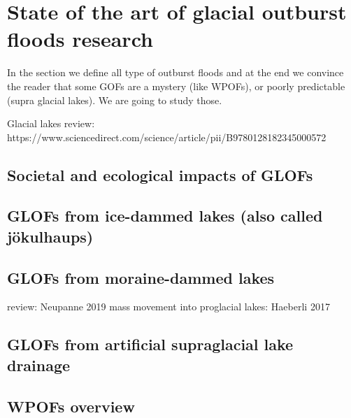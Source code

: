 \section{State of the art of glacial outburst floods research}

In the section we define all type of outburst floods and at the end we convince the reader that some GOFs are a mystery (like WPOFs), or poorly predictable (supra glacial lakes). We are going to study those. 

Glacial lakes review: https://www.sciencedirect.com/science/article/pii/B9780128182345000572


\subsection{Societal and ecological impacts of GLOFs}

\subsection{GLOFs from ice-dammed lakes (also called jökulhaups)}



\subsection{GLOFs from moraine-dammed lakes}

review: Neupanne 2019
mass movement into proglacial lakes: Haeberli 2017

\subsection{GLOFs from artificial supraglacial lake drainage}

\subsection{WPOFs overview}

